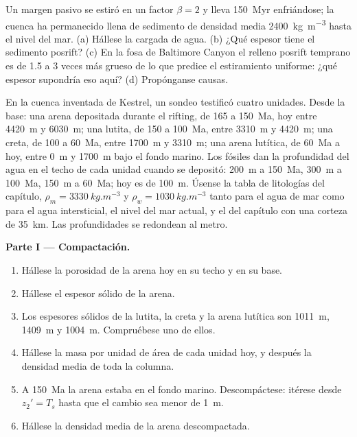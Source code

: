 \begin{exercise}[$\star\star\star$]\label{exo:b2:basins-compared:12}
Un margen pasivo se estiró en un factor $\beta = 2$ y lleva \qty{150}{Myr} enfriándose; la
cuenca ha permanecido llena de sedimento de densidad media \qty{2400}{kg.m^{-3}} hasta el nivel del mar.
(a) Hállese la  cargada de agua. (b) ¿Qué espesor tiene el sedimento posrift?
(c) En la fosa de Baltimore Canyon el relleno posrift temprano es de 1.5 a 3 veces más grueso de lo que
predice el estiramiento uniforme: ¿qué espesor supondría eso aquí? (d) Propónganse causas.
\end{exercise}

\begin{problem}\label{pb:b2:basins-compared:1}
En la cuenca inventada de Kestrel, un sondeo testificó cuatro unidades. Desde la base: una arena depositada durante
el rifting, de 165 a \qty{150}{Ma}, hoy entre \qty{4420}{m} y \qty{6030}{m}; una lutita, de 150
a \qty{100}{Ma}, entre \qty{3310}{m} y \qty{4420}{m}; una creta, de 100 a \qty{60}{Ma}, entre
\qty{1700}{m} y \qty{3310}{m}; una arena lutítica, de \qty{60}{Ma} a hoy, entre \qty{0}{m} y
\qty{1700}{m} bajo el fondo marino. Los fósiles dan la profundidad del agua en el techo de cada unidad cuando se
depositó: \qty{200}{m} a \qty{150}{Ma}, \qty{300}{m} a \qty{100}{Ma}, \qty{150}{m} a
\qty{60}{Ma}; hoy es de \qty{100}{m}. Úsense la tabla de litologías del capítulo, $\rho_m =
\qty{3330}{kg.m^{-3}}$ y $\rho_w = \qty{1030}{kg.m^{-3}}$ tanto para el agua de mar como para el agua intersticial, el nivel del mar
actual, y el  del capítulo con una corteza de \qty{35}{km}. Las profundidades se redondean
al metro.

\noindent\textbf{Parte I --- Compactación.}
\begin{enumerate}
  \item Hállese la porosidad de la arena hoy en su techo y en su base.
  \item Hállese el espesor sólido de la arena.
  \item Los espesores sólidos de la lutita, la creta y la arena lutítica son \qty{1011}{m},
        \qty{1409}{m} y \qty{1004}{m}. Compruébese uno de ellos.
  \item Hállese la masa por unidad de área de cada unidad hoy, y después la densidad media de toda la
        columna.
  \item A \qty{150}{Ma} la arena estaba en el fondo marino. Descompáctese: itérese desde $z_2' =
        T_s$ hasta que el cambio sea menor de \qty{1}{m}.
  \item Hállese la densidad media de la arena descompactada.
\end{enumerate}


\end{problem}
